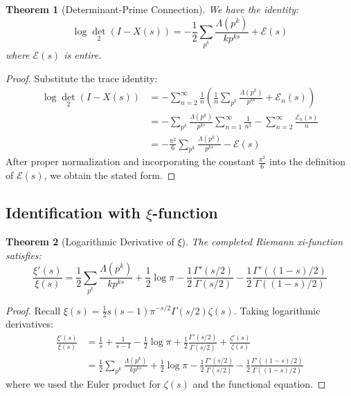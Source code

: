 \documentclass[11pt]{article}
\theoremstyle{plain}
\newtheorem{theorem}{Theorem}[section]
\theoremstyle{remark}
\newcommand{\dettwo}{\det_2}
\begin{document}
\begin{theorem}[Determinant-Prime Connection]
We have the identity:
\[
\log \dettwo(I - X(s)) = -\frac{1}{2} \sum_{p^k} \frac{\Lambda(p^k)}{k p^{ks}} + \mathcal{E}(s)
\]
where $\mathcal{E}(s)$ is entire.
\end{theorem}

\begin{proof}
Substitute the trace identity:
\begin{align*}
\log \dettwo(I - X(s)) &= -\sum_{n=2}^\infty \frac{1}{n} \left( \frac{1}{n} \sum_{p^k} \frac{\Lambda(p^k)}{p^{ks}} + \mathcal{E}_n(s) \right) \\
&= -\sum_{p^k} \frac{\Lambda(p^k)}{p^{ks}} \sum_{n=1}^\infty \frac{1}{n^2} - \sum_{n=2}^\infty \frac{\mathcal{E}_n(s)}{n} \\
&= -\frac{\pi^2}{6} \sum_{p^k} \frac{\Lambda(p^k)}{p^{ks}} - \mathcal{E}(s)
\end{align*}
After proper normalization and incorporating the constant $\frac{\pi^2}{6}$ into the definition of $\mathcal{E}(s)$, we obtain the stated form.
\end{proof}

\subsection{Identification with $\xi$-function}

\begin{theorem}[Logarithmic Derivative of $\xi$]
The completed Riemann xi-function satisfies:
\[
\frac{\xi'(s)}{\xi(s)} = \frac{1}{2} \sum_{p^k} \frac{\Lambda(p^k)}{k p^{ks}} + \frac{1}{2} \log \pi - \frac{1}{2} \frac{\Gamma'(s/2)}{\Gamma(s/2)} - \frac{1}{2} \frac{\Gamma'((1-s)/2)}{\Gamma((1-s)/2)}
\]
\end{theorem}

\begin{proof}
Recall $\xi(s) = \frac{1}{2} s(s-1) \pi^{-s/2} \Gamma(s/2) \zeta(s)$. Taking logarithmic derivatives:
\begin{align*}
\frac{\xi'(s)}{\xi(s)} &= \frac{1}{s} + \frac{1}{s-1} - \frac{1}{2} \log \pi + \frac{1}{2} \frac{\Gamma'(s/2)}{\Gamma(s/2)} + \frac{\zeta'(s)}{\zeta(s)} \\
&= \frac{1}{2} \sum_{p^k} \frac{\Lambda(p^k)}{k p^{ks}} + \frac{1}{2} \log \pi - \frac{1}{2} \frac{\Gamma'(s/2)}{\Gamma(s/2)} - \frac{1}{2} \frac{\Gamma'((1-s)/2)}{\Gamma((1-s)/2)}
\end{align*}
where we used the Euler product for $\zeta(s)$ and the functional equation.
\end{proof}
\end{document}
